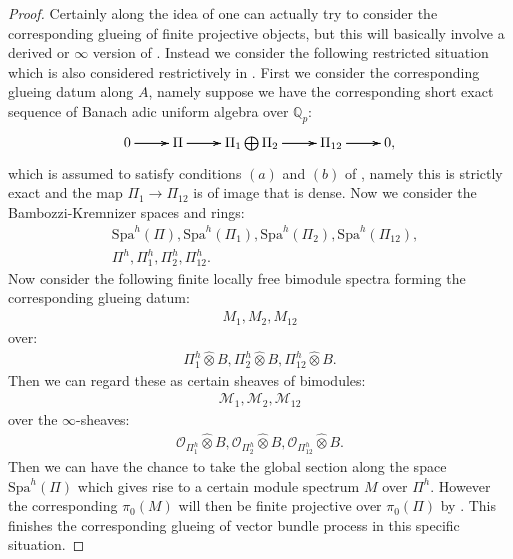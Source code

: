 \documentclass[12pt]{amsart}
\theoremstyle{definition}
\numberwithin{equation}{section}
\begin{document}
\begin{proof} 
\indent Certainly along the idea of \cite[Theorem 2.7.7]{KL1} one can actually try to consider the corresponding glueing of finite projective objects, but this will basically involve a derived or $\infty$ version of \cite[Proposition 2.4.20]{KL1}. Instead we consider the following restricted situation which is also considered restrictively in \cite[Section 5]{T3}. First we consider the corresponding glueing datum along $A$, namely suppose we have the corresponding short exact sequence of Banach adic uniform algebra over $\mathbb{Q}_p$:
\[
\xymatrix@C+0pc@R+0pc{
0   \ar[r]\ar[r]\ar[r] &\Pi \ar[r]\ar[r]\ar[r] &\Pi_1\bigoplus \Pi_2 \ar[r]\ar[r]\ar[r] & \Pi_{12} \ar[r]\ar[r]\ar[r] &0,
}
\]
which is assumed to satisfy conditions $(a)$ and $(b)$ of \cite[Definition 2.7.3]{KL1}, namely this is strictly exact and the map $\Pi_1\rightarrow \Pi_{12}$ is of image that is dense. Now we consider the Bambozzi-Kremnizer spaces and rings:
\begin{align}
&\mathrm{Spa}^h(\Pi),\mathrm{Spa}^h(\Pi_1),\mathrm{Spa}^h(\Pi_2),\mathrm{Spa}^h(\Pi_{12}),\\
&\Pi^h,\Pi_1^h,\Pi_2^h,\Pi_{12}^h.  	
\end{align}
Now consider the following finite locally free bimodule spectra forming the corresponding glueing datum:
\begin{align}
M_1,M_2,M_{12}	
\end{align}
over:
\begin{align}
\Pi_1^h\widehat{\otimes}B,\Pi_2^h\widehat{\otimes}B,\Pi_{12}^h\widehat{\otimes}B.
\end{align}
Then we can regard these as certain sheaves of bimodules:
\begin{align}
\mathcal{M}_1,\mathcal{M}_2,\mathcal{M}_{12}	
\end{align}
over the $\infty$-sheaves:
\begin{align}
\mathcal{O}_{\Pi_1^h}\widehat{\otimes}B,\mathcal{O}_{\Pi_2^h}\widehat{\otimes}B,\mathcal{O}_{\Pi_{12}^h}\widehat{\otimes}B.
\end{align}
Then we can have the chance to take the global section along the space $\mathrm{Spa}^h(\Pi)$ which gives rise to a certain module spectrum $M$ over $\Pi^h$. However the corresponding $\pi_0(M)$ will then be finite projective over $\pi_0(\Pi)$ by \cite[Proposition 5.12]{T3}. This finishes the corresponding glueing of vector bundle process in this specific situation.
\end{proof}
\end{document}
